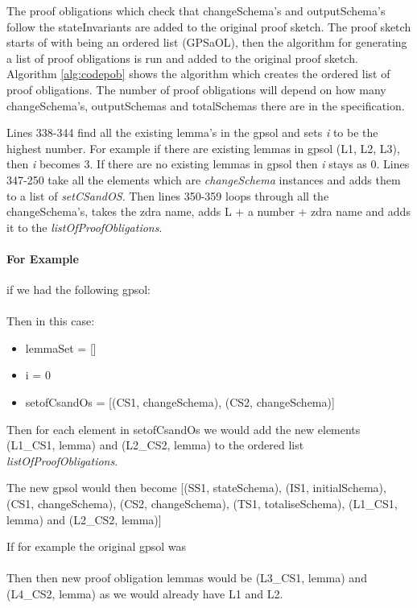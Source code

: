 The proof obligations which check that changeSchema's and outputSchema's follow
the stateInvariants are added to the original proof sketch. 
The proof sketch starts of with being an ordered list (GPSaOL), then the
algorithm for generating a list of proof obligations is run and added to the
original proof sketch. Algorithm \ref{alg:codepob} shows the algorithm which
creates the ordered list of proof obligations.
The number of proof obligations will depend on how many changeSchema's, 
outputSchemas and totalSchemas there are in the specification.

Lines 338-344 find all the existing lemma's in the \gls{gpsol} and sets \emph{i}
to be the highest number. For example if there are existing lemmas in
\gls{gpsol} (L1, L2, L3), then \emph{i} becomes 3. If there are no existing
lemmas in \gls{gpsol} then \emph{i} stays as 0. Lines 347-250 take all the
elements which are \emph{changeSchema} instances and adds them to a list of
\emph{setCSandOS}. Then lines 350-359 loops through all the changeSchema's,
takes the \gls{zdra} name, adds L + a number + \gls{zdra} name and adds it to
the \emph{listOfProofObligations}.

\paragraph{For Example}

if we had the following \gls{gpsol}: \\
 \\
Then in this case:
\begin{itemize}
\item lemmaSet = []
\item i = 0
\item setofCsandOs = [(CS1, changeSchema), (CS2, changeSchema)]
\end{itemize}

Then for each element in setofCsandOs we would add the new elements (L1\_CS1,
lemma) and (L2\_CS2, lemma) to the ordered list \emph{listOfProofObligations}.

The new \gls{gpsol} would then become [(SS1, stateSchema), (IS1, initialSchema),
(CS1, changeSchema), (CS2, changeSchema), (TS1, totaliseSchema), (L1\_CS1,
lemma) and (L2\_CS2, lemma)]

If for example the original \gls{gpsol} was \\
\\
Then then new proof obligation lemmas would be (L3\_CS1, lemma) and (L4\_CS2,
lemma) as we would already have L1 and L2.

